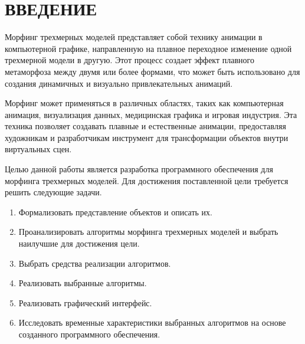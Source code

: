 \chapter*{ВВЕДЕНИЕ}

Морфинг трехмерных моделей представляет собой технику анимации в компьютерной графике, направленную на плавное переходное изменение одной трехмерной модели в другую. 
Этот процесс создает эффект плавного метаморфоза между двумя или более формами, что может быть использовано для создания динамичных и визуально привлекательных анимаций.

Морфинг может применяться в различных областях, таких как компьютерная анимация, визуализация данных, медицинская графика и игровая индустрия. 
Эта техника позволяет создавать плавные и естественные анимации, предоставляя художникам и разработчикам инструмент для трансформации объектов внутри виртуальных сцен.

Целью данной работы является разработка программного обеспечения для морфинга трехмерных моделей. Для достижения поставленной цели требуется решить следующие задачи.
\begin{enumerate}
	\item Формализовать представление объектов и описать их.
	\item Проанализировать алгоритмы морфинга трехмерных моделей и выбрать наилучшие для достижения цели.
	\item Выбрать средства реализации алгоритмов.
	\item Реализовать выбранные алгоритмы.
	\item Реализовать графический интерфейс.
	\item Исследовать временные характеристики выбранных алгоритмов на основе созданного программного обеспечения.
\end{enumerate}
